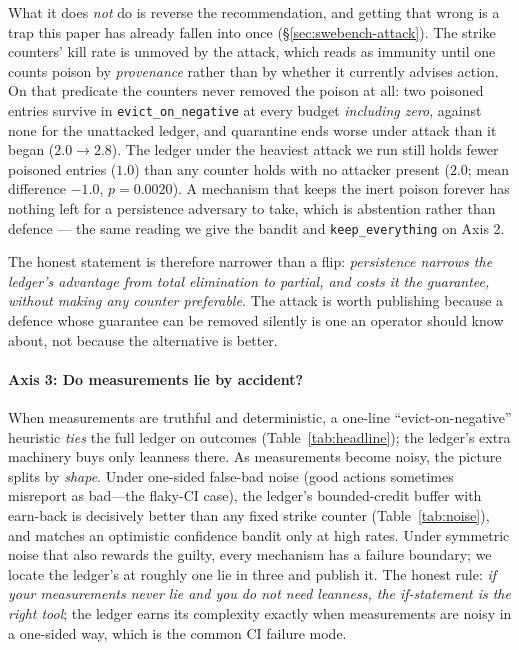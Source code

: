 What it does \emph{not} do is reverse the recommendation, and getting
that wrong is a trap this paper has already fallen into once
(\S\ref{sec:swebench-attack}). The strike counters' kill rate is
unmoved by the attack, which reads as immunity until one counts poison
by \emph{provenance} rather than by whether it currently advises action.
On that predicate the counters never removed the poison at all: two
poisoned entries survive in \texttt{evict\_on\_negative} at every
budget \emph{including zero}, against none for the unattacked ledger,
and quarantine ends worse under attack than it began ($2.0
\rightarrow 2.8$). The ledger under the heaviest attack we run still
holds fewer poisoned entries ($1.0$) than any counter holds with no
attacker present ($2.0$; mean difference $-1.0$, $p = 0.0020$). A
mechanism that keeps the inert poison forever has nothing left for a
persistence adversary to take, which is abstention rather than defence
--- the same reading we give the bandit and \texttt{keep\_everything}
on Axis 2.

The honest statement is therefore narrower than a flip: \emph{persistence
narrows the ledger's advantage from total elimination to partial, and
costs it the guarantee, without making any counter preferable.} The
attack is worth publishing because a defence whose guarantee can be
removed silently is one an operator should know about, not because the
alternative is better.

\paragraph{Axis 3: Do measurements lie by accident?}
When measurements are truthful and deterministic, a one-line
``evict-on-negative'' heuristic \emph{ties} the full ledger on outcomes
(Table~\ref{tab:headline}); the ledger's extra machinery buys only
leanness there. As measurements become noisy, the picture splits by
\emph{shape}. Under one-sided false-bad noise (good actions sometimes
misreport as bad---the flaky-CI case), the ledger's bounded-credit buffer
with earn-back is decisively better than any fixed strike counter
(Table~\ref{tab:noise}), and matches an optimistic confidence bandit only
at high rates. Under symmetric noise that also rewards the guilty, every
mechanism has a failure boundary; we locate the ledger's at roughly one
lie in three and publish it. The honest rule: \emph{if your measurements
never lie and you do not need leanness, the if-statement is the right
tool}; the ledger earns its complexity exactly when measurements are
noisy in a one-sided way, which is the common CI failure mode.

